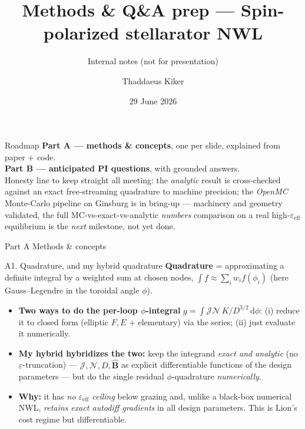 \documentclass[aspectratio=169]{beamer}
\title{Methods \& Q\&A prep --- Spin-polarized stellarator NWL}
\subtitle{Internal notes (not for presentation)}
\author{Thaddaeus Kiker}
\date{29 June 2026}
\newcommand{\Bhat}{\hat{\bm{B}}}
\newcommand{\eps}{\varepsilon}
\newcommand{\dd}{\,\mathrm{d}}
\begin{document}
\begin{frame}[plain]\titlepage\end{frame}

\begin{frame}{Roadmap}
  \textbf{Part A --- methods \& concepts}, one per slide, explained from paper + code.\\[0.4em]
  \textbf{Part B --- anticipated PI questions}, with grounded answers.\\[1em]
  {\small Honesty line to keep straight all meeting: the \emph{analytic} result is cross-checked
  against an exact free-streaming quadrature to machine precision; the \emph{OpenMC} Monte-Carlo
  pipeline on Ginsburg is in bring-up --- machinery and geometry validated, the full
  MC-vs-exact-vs-analytic \emph{numbers} comparison on a real high-$\eps_{\mathrm{eff}}$ equilibrium
  is the \emph{next} milestone, not yet done.}
\end{frame}

\begin{frame}[t]{Part A}
  \centering\vfill{\Huge Methods \& concepts}\vfill
\end{frame}

\begin{frame}{A1. Quadrature, and my hybrid quadrature}
  \small
  \textbf{Quadrature} = approximating a definite integral by a weighted sum at chosen nodes,
  $\int f \approx \sum_i w_i f(\phi_i)$ (here Gauss--Legendre in the toroidal angle $\phi$).
  \begin{itemize}
    \item \textbf{Two ways to do the per-loop $\phi$-integral} $g=\int \mathcal{J}\mathcal{N}\,K/D^{3/2}\dd\phi$:
      (i) reduce it to closed form (elliptic $F,E$ + elementary) via the series; (ii) just
      evaluate it numerically.
    \item \textbf{My hybrid hybridizes the two:} keep the integrand
      \emph{exact and analytic} (no $\eps$-truncation) --- $\mathcal{J},\mathcal{N},D,\Bhat$ as explicit
      differentiable functions of the design parameters --- but do the single residual $\phi$-quadrature
      \emph{numerically}.
    \item \textbf{Why:} it has \emph{no $\eps_{\mathrm{eff}}$ ceiling} below grazing and, unlike a
      black-box numerical NWL, \emph{retains exact autodiff gradients} in all design parameters.
      This is Lion's cost regime but differentiable.
  \end{itemize}
\end{frame}
\end{document}
